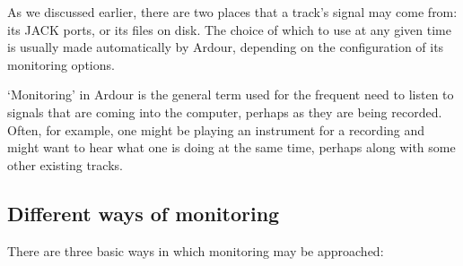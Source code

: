 \documentclass[10pt,a4paper]{book}
\begin{document}
As we discussed earlier, there are two places that a track's signal
may come from: its JACK ports, or its files on disk.  The choice of
which to use at any given time is usually made automatically by
Ardour, depending on the configuration of its monitoring options.

`Monitoring' in Ardour is the general term used for the frequent need
to listen to signals that are coming into the computer, perhaps as
they are being recorded.  Often, for example, one might be playing an
instrument for a recording and might want to hear what one is doing at
the same time, perhaps along with some other existing tracks.


\subsection{Different ways of monitoring}

There are three basic ways in which monitoring may be approached:
\end{document}
